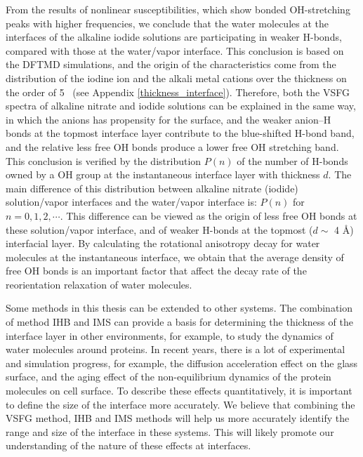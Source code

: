 From the results of nonlinear susceptibilities, which show bonded OH-stretching peaks with higher frequencies, 
we conclude that the water molecules at the interfaces of the alkaline iodide solutions are participating 
in weaker H-bonds, compared with those at the water/vapor interface. 
This conclusion is based on the DFTMD simulations, and %
the origin of the characteristics come from the distribution of the iodine ion and the alkali metal cations
over the thickness on the order of 5 \A\ (see Appendix \ref{thickness_interface}).
Therefore, both the VSFG spectra of alkaline nitrate and iodide solutions can be explained in the same way, 
in which the anions has propensity for the surface, and the weaker anion--H bonds at the topmost interface layer contribute to the blue-shifted H-bond band,
and the relative less free OH bonds produce a lower free OH stretching band.
This conclusion is verified by the distribution $P(n)$ of the number of H-bonds owned by a OH group at the instantaneous interface layer with thickness $d$. 
The main difference of this distribution between alkaline nitrate (iodide) solution/vapor interfaces and the water/vapor interface is:
$P(n)$ for $n= 0, 1, 2,\cdots$. This difference can be viewed as the origin of less free OH bonds at these solution/vapor interface, 
and of weaker H-bonds at the topmost ($d \sim$ 4 \AA) interfacial layer.
By calculating the rotational anisotropy decay for water molecules at the instantaneous interface, 
we obtain that the average density of free OH bonds is an important factor that affect the decay rate of the reorientation relaxation of water molecules.


Some methods in this thesis can be extended to other systems.
The combination of method IHB and IMS can provide a basis for determining the thickness of the interface layer in other environments, 
for example, to study the dynamics of water molecules around proteins. 
In recent years, there is a lot of experimental and simulation progress, for example, the diffusion acceleration effect on the glass surface\cite{ZhuL11,ZhangWei16}, 
and the aging effect of the non-equilibrium dynamics of the protein molecules on cell surface\cite{HuXiaohu16}. 
To describe these effects quantitatively, it is important to define the size of the interface more accurately. 
We believe that combining the VSFG method, IHB and IMS methods will help us more accurately identify the range and size of the interface in these systems.
This will likely promote our understanding of the nature of these effects at interfaces.

